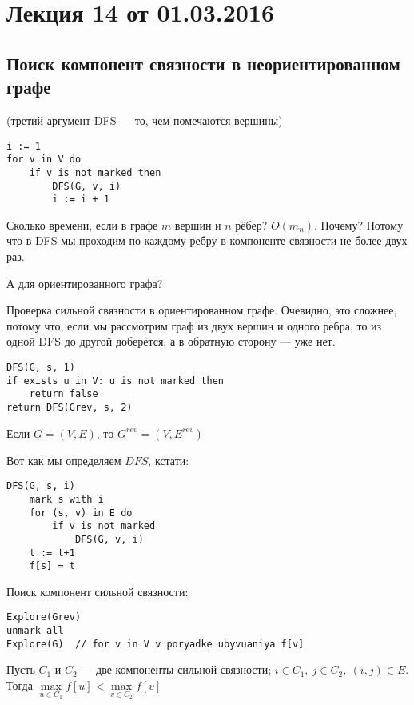 



\section*{Лекция 14 от 01.03.2016}

\subsection{Поиск компонент связности в неориентированном графе}
(третий аргумент DFS --- то,  чем помечаются вершины)
\begin{lstlisting}
i := 1
for v in V do
    if v is not marked then
        DFS(G, v, i)
        i := i + 1
\end{lstlisting}

Сколько времени, если в графе $m$ вершин и $n$ рёбер? $O(m_n)$. Почему? Потому что в DFS мы проходим по каждому ребру в компоненте связности не более двух раз.

А для ориентированного графа?

Проверка сильной связности в ориентированном графе. Очевидно, это сложнее, потому что, если мы рассмотрим граф из двух вершин и одного ребра, то из одной DFS до другой доберётся, а в обратную сторону --- уже нет.

\begin{lstlisting}
DFS(G, s, 1)
if exists u in V: u is not marked then
    return false
return DFS(Grev, s, 2)
\end{lstlisting}

Если $G = (V, E)$, то $G^{rev} = (V, E^{rev})$

Вот как мы определяем $DFS$, кстати:

\begin{lstlisting}
DFS(G, s, i)
    mark s with i
    for (s, v) in E do
        if v is not marked
            DFS(G, v, i)
    t := t+1
    f[s] = t
\end{lstlisting}

Поиск компонент сильной связности:

\begin{lstlisting}
Explore(Grev)
unmark all
Explore(G)  // for v in V v poryadke ubyvuaniya f[v]
\end{lstlisting}

Пусть $C_1$ и $C_2$ --- две компоненты сильной связности; $i\in C_1,\ j\in C_2,\ (i,j)\in E$. Тогда $\max\limits_{u\in C_1} f[u] < \max\limits_{v\in C_2} f[v]$

